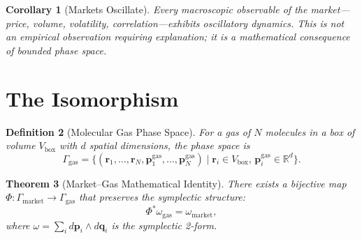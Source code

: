\documentclass[twocolumn,10pt]{article}
\newtheorem{theorem}{Theorem}[section]
\newtheorem{definition}[theorem]{Definition}
\newtheorem{corollary}[theorem]{Corollary}
\theoremstyle{remark}
\begin{document}
\begin{corollary}[Markets Oscillate]
\label{cor:markets_oscillate}
Every macroscopic observable of the market---price, volume, volatility, correlation---exhibits oscillatory dynamics.  This is not an empirical observation requiring explanation; it is a mathematical consequence of bounded phase space.
\end{corollary}


\section{The Isomorphism}
\label{sec:isomorphism}

\begin{definition}[Molecular Gas Phase Space]
\label{def:gas_phase_space}
For a gas of $N$ molecules in a box of volume $V_{\mathrm{box}}$ with $d$ spatial dimensions, the phase space is
\begin{equation}
    \Gamma_{\mathrm{gas}} = \{(\mathbf{r}_1, \ldots, \mathbf{r}_N, \mathbf{p}_1^{\mathrm{gas}}, \ldots, \mathbf{p}_N^{\mathrm{gas}}) \mid \mathbf{r}_i \in V_{\mathrm{box}}, \, \mathbf{p}_i^{\mathrm{gas}} \in \mathbb{R}^d\}.
    \label{eq:gas_phase_space}
\end{equation}
\end{definition}

\begin{theorem}[Market--Gas Mathematical Identity]
\label{thm:isomorphism}
There exists a bijective map $\Phi : \Gamma_{\mathrm{market}} \to \Gamma_{\mathrm{gas}}$ that preserves the symplectic structure:
\begin{equation}
    \Phi^* \omega_{\mathrm{gas}} = \omega_{\mathrm{market}},
    \label{eq:symplectomorphism}
\end{equation}
where $\omega = \sum_i d\mathbf{p}_i \wedge d\mathbf{q}_i$ is the symplectic 2-form.
\end{theorem}
\end{document}
